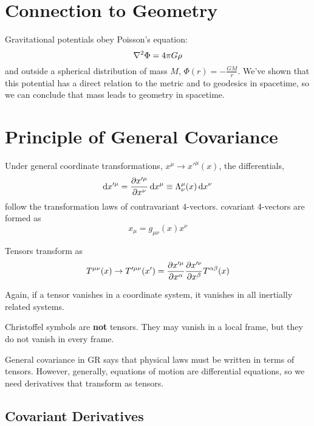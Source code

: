 \documentclass[a4paper,twoside,master.tex]{subfiles}
\begin{document}
\section{Connection to Geometry}\label{sec:connection_to_geometry}


Gravitational potentials obey Poisson's equation:
\begin{equation}
    \laplacian{\Phi} = 4 \pi G \rho
\end{equation}
and outside a spherical distribution of mass $ M $, $ \Phi(r) = - \frac{GM}{r} $. We've shown that this potential has a direct relation to the metric and to geodesics in spacetime, so we can conclude that mass leads to geometry in spacetime.

\section{Principle of General Covariance}\label{sec:principle_of_general_covariance}

Under general coordinate transformations, $ x^{\mu} \to x'^{\mu}(x) $, the differentials,
\begin{equation}
    \dd{x'^{\mu}} = \pdv{x'^{\mu}}{x^{\nu}} \dd{x^{\mu}} \equiv \Lambda^{\mu}_{\nu}(x) \dd{x^{\nu}}
\end{equation}
follow the transformation laws of contravariant 4-vectors. covariant 4-vectors are formed as
\begin{equation}
    x_{\mu} = g_{\mu \nu}(x) x^{\nu}
\end{equation}

Tensors transform as
\begin{equation}
    T^{\mu \nu}(x) \to T'^{\mu \nu}(x') = \pdv{x'^{\mu}}{x^{\alpha}} \pdv{x'^{\nu}}{x^{\beta}} T^{\alpha \beta}(x)
\end{equation}

Again, if a tensor vanishes in a coordinate system, it vanishes in all inertially related systems.

Christoffel symbols are \textbf{not} tensors. They may vanish in a local frame, but they do not vanish in every frame.

General covariance in GR says that physical laws must be written in terms of tensors. However, generally, equations of motion are differential equations, so we need derivatives that transform as tensors.

\subsection{Covariant Derivatives}\label{sub:covariant_derivatives}
\end{document}
